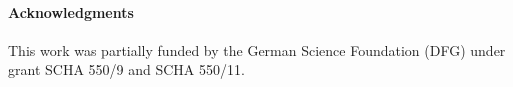 \paragraph{Acknowledgments}

This work was partially funded 
by 
the German Science Foundation (DFG) under 
grant 
SCHA 550/9   %
and
SCHA 550/11.  %

